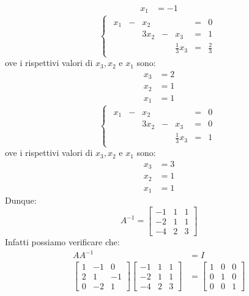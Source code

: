 \documentclass[12pt]{report}
\newcounter{exercise}
\begin{document}
\begin{exercise}{}{}
\begin{align*}
x_1 &= -1
\end{align*}
\[
\begin{cases}
\begin{array}{rcrcrcr}
  x_1 & - & x_2 & & & = & 0 \\
  &  & 3x_2 & - & x_3 & = & 1 \\
  &  &  &   & \frac{1}{3}x_3 & = & \frac{2}{3}
\end{array}
\end{cases}
\]
ove i rispettivi valori di $x_3, x_2$ e $x_1$ sono:
\begin{align*}
	x_3 &= 2 \\
	x_2 &= 1 \\
	x_1 &= 1
\end{align*}
\[
\begin{cases}
\begin{array}{rcrcrcr}
  x_1 & - & x_2 & & & = & 0 \\
  &  & 3x_2 & - & x_3 & = & 0 \\
  &  &  &   & \frac{1}{3}x_3 & = & 1
\end{array}
\end{cases}
\]
ove i rispettivi valori di $x_3, x_2$ e $x_1$ sono:
\begin{align*}
	x_3 &= 3 \\
	x_2 &= 1 \\
	x_1 &= 1
\end{align*}
Dunque:
\[
A^{-1} = \begin{bmatrix}
	-1 & 1 & 1 \\
	-2 & 1 & 1 \\
	-4 & 2 & 3
\end{bmatrix}
\]
Infatti possiamo verificare che:
\begin{align*}
AA^{-1} &= I \\
\begin{bmatrix}
	1 & -1 & 0 \\
	2 & 1 & -1 \\
	0 & -2 & 1
\end{bmatrix}\begin{bmatrix}
	-1 & 1 & 1 \\
	-2 & 1 & 1 \\
	-4 & 2 & 3
\end{bmatrix} &= \begin{bmatrix}
	1 & 0 & 0 \\
	0 & 1 & 0 \\
	0 & 0 & 1
\end{bmatrix}
\end{align*}
\end{exercise}
\end{document}
